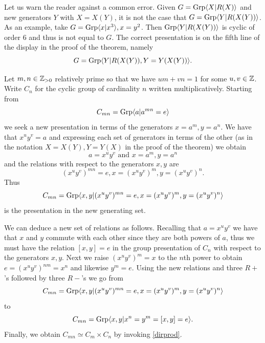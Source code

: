\begin{ap} Let us warn the reader against a common error. Given $G =
    \mathrm{Grp}\langle X|R(X)\rangle$ and new generators $Y$ with $X = X(Y)$, it is not the case
    that $G = \mathrm{Grp}\langle Y|R(X(Y))\rangle$. As an example, take $G = \mathrm{Grp}\langle x|x^3\rangle, x = y^2$.
    Then $\mathrm{Grp}\langle Y|R(X(Y))\rangle$ is cyclic of order 6 and thus is not equal to $G$.
    The correct presentation is on the fifth line of the display in the proof
    of the theorem, namely \[G = \mathrm{Grp}\langle Y | R(X(Y)), Y = Y(X(Y))\rangle.\]
\end{ap}

\begin{eg} Let $m,n\in \mathbb{Z}_{>0}$ relatively prime so that we have $um+vn =1$ for
    some $u,v\in\mathbb{Z}$. Write $C_n$ for the cyclic group of cardinality $n$
    written multiplicatively. Starting from \[C_{mn} = \mathrm{Grp}\langle a|a^{mn} = e\rangle\] we
    seek a new presentation in terms of the generators $x=a^m, y=a^n$. We have
    that $x^u y^v = a$ and expressing each set of generators in terms of the
    other (as in the notation \(X = X(Y), Y = Y(X)\) in the proof of the
    theorem) we obtain \[a = x^u y^v \text{ and } x=a^m, y = a^n\] and the
    relations with respect to the generators $x,y$ are \[(x^u y^v)^{mn} = e, x
    = (x^u y^v)^m, y = (x^u y^v)^n.\] Thus \[C_{mn} = \mathrm{Grp}\langle x,y|(x^u y^v)^{mn} =
    e, x = (x^u y^v)^m, y = (x^u y^v)^n\rangle \] is the presentation in the new
    generating set.

    We can deduce a new set of relations as follows. Recalling that $a = x^u
    y^v$ we have that $x$ and $y$ commute with each other since they are both
    powers of $a$, thus we must have the relation $[x,y]=e$ in the group
    presentation of $C_n$ with respect to the generators $x,y$. Next we raise
    $(x^uy^v)^m = x$ to the $n$th power to obtain $e = (x^u y^v)^{nm} = x^n$
    and likewise $y^m = e$. Using the new relations and three $R+$'s followed
    by three $R-$'s we go from \[C_{mn} = \mathrm{Grp}\langle x,y|(x^u y^v)^{mn} = e, x = (x^u
    y^v)^m, y = (x^u y^v)^n\rangle \] to \[C_{mn} = \mathrm{Grp}\langle x,y|x^n = y^m = [x,y] =
    e\rangle.\] Finally, we obtain $C_{mn} \simeq C_m\times C_n$ by invoking
    \ref{dirprod}.
\end{eg}

